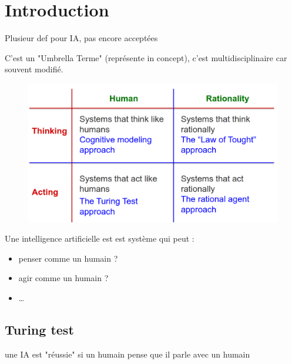\section{Introduction}

	Plusieur def pour IA, pas encore acceptées
	
	C'est un "Umbrella Terme" (représente in concept), c'est multidisciplinaire car souvent modifié.
	
	\begin{figure}[H]
		\centering
		\includegraphics[width=\textwidth]{img/IA.png}
	\end{figure}
	Une intelligence artificielle est est système qui peut :
	\begin{itemize}
		\item penser comme un humain ?
		\item agir comme un humain ?
		\item \dots 
	\end{itemize}
	\subsection{Turing test}
		une IA est "réussie" si un humain pense que il parle avec un humain